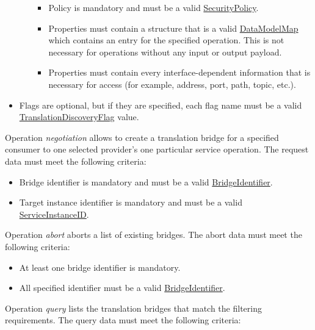\documentclass[a4paper]{arrowhead}
\newcommand{\pref}[1]{{\textcolor{ArrowheadGrey}{\hyperref[sec:model:primitives:#1]{#1}}}}
\begin{document}
\begin{itemize}
\begin{itemize}
\begin{itemize}
            \item Policy is mandatory and must be a valid \pref{SecurityPolicy}.
            \item Properties must contain a structure that is a valid \hyperref[sec:model:DataModelMap]{DataModelMap} which contains an entry for the specified operation. This is not necessary for operations without any input or output payload.
            \item Properties must contain every interface-dependent information that is necessary for access (for example, address, port, path, topic, etc.).
        \end{itemize}
    \end{itemize}
    \item Flags are optional, but if they are specified, each flag name must be a valid \pref{TranslationDiscoveryFlag} value.
\end{itemize}


Operation \textit{negotiation} allows to create a translation bridge for a specified consumer to one selected provider's one particular service operation. The request data must meet the following criteria:

\begin{itemize}
    \item Bridge identifier is mandatory and must be a valid \pref{BridgeIdentifier}.
    \item Target instance identifier is mandatory and  must be a valid \pref{ServiceInstanceID}.
\end{itemize}


Operation \textit{abort} aborts a list of existing bridges. The abort data must meet the following criteria:

\begin{itemize}
    \item At least one bridge identifier is mandatory.
    \item All specified identifier must be a valid \pref{BridgeIdentifier}.
\end{itemize}


Operation \textit{query} lists the translation bridges that match the filtering requirements. The query data must meet the following criteria:
\end{document}
